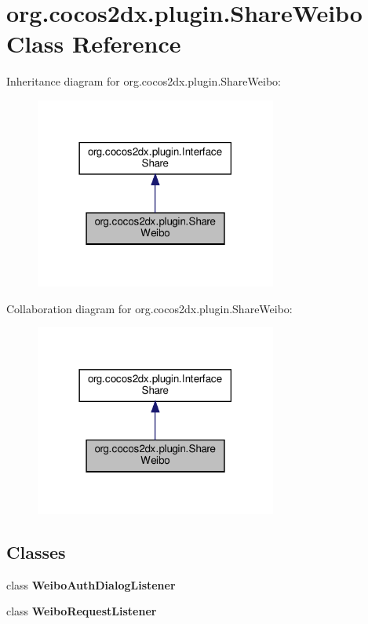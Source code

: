 \hypertarget{classorg_1_1cocos2dx_1_1plugin_1_1ShareWeibo}{}\section{org.\+cocos2dx.\+plugin.\+Share\+Weibo Class Reference}
\label{classorg_1_1cocos2dx_1_1plugin_1_1ShareWeibo}


Inheritance diagram for org.\+cocos2dx.\+plugin.\+Share\+Weibo\+:
\nopagebreak
\begin{figure}[H]
\begin{center}
\leavevmode
\includegraphics[width=225pt]{classorg_1_1cocos2dx_1_1plugin_1_1ShareWeibo__inherit__graph}
\end{center}
\end{figure}


Collaboration diagram for org.\+cocos2dx.\+plugin.\+Share\+Weibo\+:
\nopagebreak
\begin{figure}[H]
\begin{center}
\leavevmode
\includegraphics[width=225pt]{classorg_1_1cocos2dx_1_1plugin_1_1ShareWeibo__coll__graph}
\end{center}
\end{figure}
\subsection*{Classes}
\begin{DoxyCompactItemize}
\item 
class {\bfseries Weibo\+Auth\+Dialog\+Listener}
\item 
class {\bfseries Weibo\+Request\+Listener}
\end{DoxyCompactItemize}
